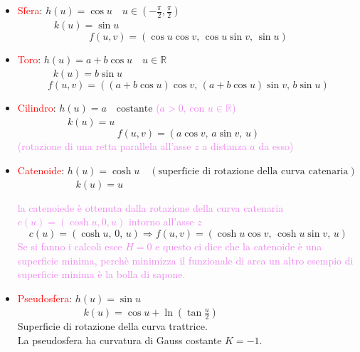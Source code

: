         \begin{esempio}
        \mbox{}

        \begin{itemize}
            \item \textcolor{red}{Sfera}: \quad $h(u) = \cos u \quad u \in \left(-\frac{\pi}{2}, \frac{\pi}{2}\right)$\\
            $\phantom{\text{Sfera}:} \quad k(u) = \sin u$
            \[
            f(u,v) = (\cos u \cos v, \, \cos u \sin v, \, \sin u)
            \]
            \item \textcolor{red}{Toro}: \quad $h(u) = a + b \cos u \quad u \in \mathbb{R}$\\
            $\phantom{\text{Toro}:} \quad k(u) = b \sin u$ 
            \[
            f(u,v) = ((a + b \cos u)\cos v, \, (a + b \cos u)\sin v, \, b \sin u)
            \]
            \item \textcolor{red}{Cilindro}: \quad $h(u) = a \quad \text{costante}$ \textcolor{violet}{($a > 0$, con $u \in \mathbb{R}$)}\\
            $\phantom{\text{Cilindro}:} \quad k(u) = u$
            \[
            f(u,v) = (a \cos v, \, a \sin v, \, u)
            \]
            \textcolor{violet}{(rotazione di una retta parallela all'asse $z$ a distanza $a$ da esso)}
            \item \textcolor{red}{Catenoide}: \quad $h(u) = \cosh u \quad \left(\text{superficie di rotazione della curva catenaria}\right)$\\
            $\phantom{\text{Catenoide}:} \quad k(u) = u$

            \textcolor{violet}{la catenoiede è ottenuta dalla rotazione della curva catenaria $c(u) = (\cosh u, 0, u)$ intorno all'asse $z$}
            \[
            c(u) = (\cosh u, \, 0, \, u) \Rightarrow f(u,v) = (\cosh u \cos v, \, \cosh u \sin v, \, u)
            \]
            \textcolor{violet}{Se si fanno i calcoli esce $H=0$ e questo ci dice che la catenoide è una superficie minima, perchè minimizza 
            il funzionale di area un altro esempio di superficie minima è la bolla di sapone.}
            \item \textcolor{red}{Pseudosfera}: \quad $h(u) = \sin u$\\
            $\phantom{\text{Pseudosfera}:} \quad k(u) = \cos u + \ln\left(\tan \frac{u}{2}\right)$\\
            Superficie di rotazione della curva trattrice.\\
            La pseudosfera ha curvatura di Gauss costante $K = -1$.
        \end{itemize}
        \end{esempio}
